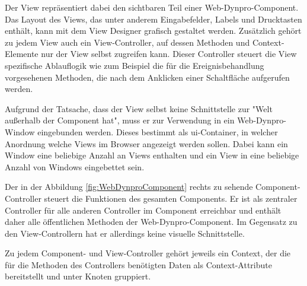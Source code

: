 

Der View repräsentiert dabei den sichtbaren Teil einer Web-Dynpro-Component. Das Layout des Views, das unter anderem Eingabefelder, Labels und Drucktasten enthält, kann mit dem View Designer grafisch gestaltet werden. Zusätzlich gehört zu jedem View auch ein View-Controller, auf dessen Methoden und Context-Elemente nur der View selbst zugreifen kann. Dieser Controller steuert die View spezifische Ablauflogik wie zum Beispiel die für die Ereignisbehandlung vorgesehenen Methoden, die nach dem Anklicken einer Schaltfläche aufgerufen werden.\autocite[Vgl.][S.738]{KELLER2015}

Aufgrund der Tatsache, dass der View selbst keine Schnittstelle zur "Welt außerhalb der Component hat"\autocite[S.740]{KELLER2015}, muss er zur Verwendung in ein Web-Dynpro-Window eingebunden werden. Dieses bestimmt als \ac{ui}-Container, in welcher Anordnung welche Views im Browser angezeigt werden sollen. Dabei kann ein Window eine beliebige Anzahl an Views enthalten und ein View in eine beliebige Anzahl von Windows eingebettet sein. \autocite[Vgl.][S.740]{KELLER2015}

Der in der Abbildung \ref{fig:WebDynproComponent} rechts zu sehende Component-Controller steuert die Funktionen des gesamten Components. Er ist als zentraler Controller für alle anderen Controller im Component erreichbar und enthält daher alle öffentlichen Methoden der Web-Dynpro-Component. Im Gegensatz zu den View-Controllern hat er allerdings keine visuelle Schnittstelle. \autocite[Vgl.][S.45f]{NET310}

Zu jedem Component- und View-Controller gehört jeweils ein Context, der die für die Methoden des Controllers benötigten Daten als Context-Attribute bereitstellt und unter Knoten gruppiert.\autocite[Vgl.][S.61f]{HOFFMANN2006}

